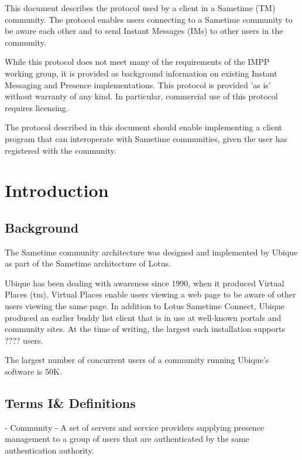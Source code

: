 \documentclass[titlepage,oneside]{book}
\begin{document}
\par{} This document describes the protocol used by a client in a
Sametime (TM) community. The protocol enables users connecting to a
Sametime community to be aware each other and to send Instant Messages
(IMs) to other users in the community.

\par{} While this protocol does not meet many of the requirements of
the IMPP working group, it is provided as background information on
existing Instant Messaging and Presence implementations. This protocol
is provided 'as is' without warranty of any kind. In particular,
commercial use of this protocol requires licensing.

\par{} The protocol described in this document should enable
implementing a client program that can interoperate with Sametime
communities, given the user has registered with the community.

\chapter{Introduction}

\section{Background}

\par{} The Sametime community architecture was designed and
implemented by Ubique as part of the Sametime architecture of Lotus.

\par{} Ubique has been dealing with awareness since 1990, when it
produced Virtual Places (tm). Virtual Places enable users viewing a
web page to be aware of other users viewing the same page. In addition
to Lotus Sametime Connect, Ubique produced an earlier buddy list
client that is in use at well-known portals and community sites. At
the time of writing, the largest such installation supports ????
users.

\par{} The largest number of concurrent users of a community running
Ubique's software is 50K.

\section{Terms I\& Definitions}

\par{} - Community - A set of servers and service providers supplying
presence management to a group of users that are authenticated by the
same authentication authority.
\end{document}

